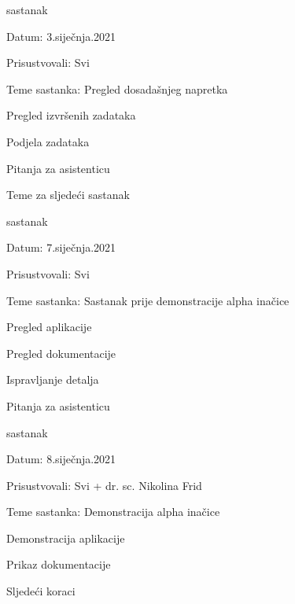 \begin{packed_enum}
			
				\item  sastanak
			\item[] \begin{packed_item}
				\item Datum: 3.siječnja.2021
				\item Prisustvovali: Svi
				\item Teme sastanka: Pregled dosadašnjeg napretka
				\begin{packed_item}
				    \item Pregled izvršenih zadataka
					\item Podjela zadataka
					\item Pitanja za asistenticu
					\item Teme za sljedeći sastanak
				\end{packed_item}
			\end{packed_item}
			
				\item  sastanak
			\item[] \begin{packed_item}
				\item Datum: 7.siječnja.2021
				\item Prisustvovali: Svi
				\item Teme sastanka: Sastanak prije demonstracije alpha inačice
				\begin{packed_item}
                    \item Pregled aplikacije
                    \item Pregled dokumentacije
                    \item Ispravljanje detalja
                    \item Pitanja za asistenticu
				\end{packed_item}
			\end{packed_item}
			
			\item  sastanak
			\item[] \begin{packed_item}
				\item Datum: 8.siječnja.2021
				\item Prisustvovali: Svi + dr. sc. Nikolina Frid
				\item Teme sastanka: Demonstracija alpha inačice
				\begin{packed_item}
                    \item Demonstracija aplikacije
                    \item Prikaz dokumentacije
                    \item Sljedeći koraci
				\end{packed_item}
			\end{packed_item}
			

\end{packed_enum}
